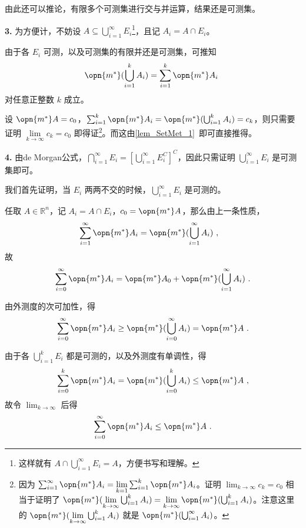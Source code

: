由此还可以推论，有限多个可测集进行交与并运算，结果还是可测集。

\textbf{3.} 为方便计，不妨设 $A\subseteq \bigcup_{i=1}^\infty E_i$\footnote{这样就有 $A\cap \bigcup_{i=1}^{\infty}E_i=A$，方便书写和理解。}，且记 $A_i=A\cap E_i$。

由于各 $E_i$ 可测，以及可测集的有限并还是可测集，可推知
\begin{equation}
\opn{m^*}(\bigcup_{i=1}^k A_i)=\sum_{i=1}^k \opn{m^*}A_i~
\end{equation}
对任意正整数 $k$ 成立。

设 $\opn{m^*}A=c_0$，$\sum_{i=1}^k \opn{m^*}A_i=\opn{m^*}(\bigcup_{i=1}^k A_i)=c_k$，则只需要证明 $\lim\limits_{k\to \infty}c_k=c_0$ 即得证\footnote{因为 $\sum_{i=1}^\infty \opn{m^*}A_i=\lim\limits_{k=1}\sum_{i=1}^k\opn{m^*}A_i$。证明 $\lim_{k\to\infty}c_k=c_0$ 相当于证明了 $\opn{m^*}(\lim\limits_{k\to\infty}\bigcup^k_{i=1}A_i)=\lim\limits_{k\to\infty}\opn{m^*}(\bigcup^k_{i=1}A_i)$。注意这里的 $\opn{m^*}(\lim\limits_{k\to\infty}\bigcup^k_{i=1}A_i)$ 就是 $\opn{m^*}(\bigcup^\infty_{i=1}A_i)$。}。而这由\autoref{lem_SetMet_1}~即可直接推得。%

\textbf{4.} 由de Morgan公式，$\bigcap_{i=1}^\infty E_i=[\bigcup_{i=1}^\infty E_i^C]^C$，因此只需证明 $\bigcup_{i=1}^\infty E_i$ 是可测集即可。

我们首先证明，当 $E_i$ 两两不交的时候，$\bigcup^\infty_{i=1}E_i$ 是可测的。

任取 $A\in\mathbb{R}^n$，记 $A_i=A\cap E_i$，$c_0=\opn{m^*}A$，那么由上一条性质，
\begin{equation}
\begin{aligned}
\sum^\infty_{i=1}\opn{m^*}A_i&=\opn{m^*}(\bigcup_{i=1}^\infty A_i)~,
\end{aligned}
\end{equation}
故
\begin{equation}\label{eq_MsbSet_2}
\sum^\infty_{i=0}\opn{m^*}A_i=\opn{m^*}A_0+\opn{m^*}(\bigcup_{i=1}^\infty A_i)~.
\end{equation}


由外测度的次可加性，得
\begin{equation}\label{eq_MsbSet_3}
\sum_{i=0}^\infty\opn{m^*}A_i\geq \opn{m^*}(\bigcup_{i=0}^\infty A_i)=\opn{m^*}A~.
\end{equation}

由于各 $\bigcup_{i=1}^k E_i$ 都是可测的，以及外测度有单调性，得
\begin{equation}
\sum_{i=0}^k\opn{m^*}A_i=\opn{m^*}(\bigcup_{i=0}^k A_i)\leq \opn{m^*}A~,
\end{equation}
故令 $\lim_{k\to \infty}$ 后得
\begin{equation}\label{eq_MsbSet_5}
\sum_{i=0}^\infty\opn{m^*}A_i\leq \opn{m^*}A~.
\end{equation}

